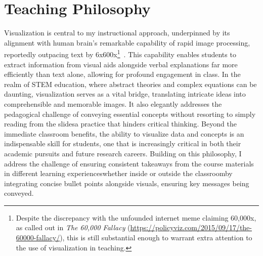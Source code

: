 \section{Teaching Philosophy}
Visualization is central to my instructional approach, underpinned by its alignment with human brain's remarkable capability of rapid image processing, reportedly outpacing text by 6x\textendash 600x\footnote{
    Despite the discrepancy with the unfounded internet meme claiming 60,000x, as called out in \emph{The 60,000 Fallacy} (\url{https://policyviz.com/2015/09/17/the-60000-fallacy/}), this is still substantial enough to warrant extra attention to the use of visualization in teaching.
}~\cite{ResearchPictureWorth}.
This capability enables students to extract information from visual aids alongside verbal explanations far more efficiently than text alone, allowing for profound engagement in class. In the realm of STEM education, where abstract theories and complex equations can be daunting, visualization serves as a vital bridge, translating intricate ideas into comprehensible and memorable images. It also elegantly addresses the pedagogical challenge of conveying essential concepts without resorting to simply reading from the slides\textemdash a practice that hinders critical thinking. Beyond the immediate classroom benefits, the ability to visualize data and concepts is an indispensable skill for students, one that is increasingly critical in both their academic pursuits and future research careers. Building on this philosophy, I address the challenge of ensuring consistent takeaways from the course materials in different learning experiences\textemdash whether inside or outside the classroom\textemdash by integrating concise bullet points alongside visuals, ensuring key messages being conveyed.

